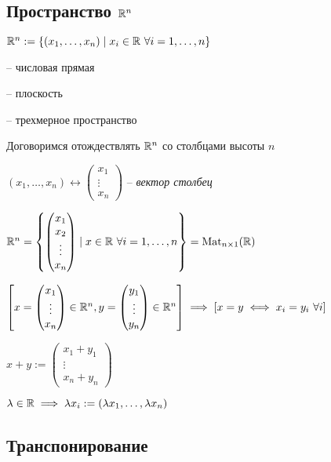 \subsection{Пространство $\mathbb{R}^n$}
$\mathbb{R}^n := \{(x_1, \dots, x_n) \mid x_i \in \mathbb{R} \ \forall i = 1, \dots, n \}$

\begin{description}[nosep]
\item[$\RR^1$] -- числовая прямая
\item[$\RR^2$] -- плоскость
\item[$\RR^3$] -- трехмерное пространство
\end{description}

\bigskip
Договоримся отождествлять \( \mathbb{R}^n \) со столбцами высоты \( n \)

$(x_1, \dots, x_n) \leftrightarrow \begin{pmatrix} x_1 \\ \vdots \\ x_n \end{pmatrix}$ -- \textit{вектор столбец}

$\mathbb{R}^n = \left\{\begin{pmatrix} x_1 \\ x_2 \\ \vdots \\ x_n \end{pmatrix} \mid x \in \mathbb{R} \ \forall i = 1, \dots, n \right\} = \text{Mat}_{n \times 1}(\mathbb{R})$

$\left[ x = \begin{pmatrix}
    x_1 \\ \vdots \\ x_n
\end{pmatrix} \in \mathbb{R}^n, y = \begin{pmatrix}
    y_1 \\ \vdots \\ y_n
\end{pmatrix} \in \mathbb{R}^n \right] \implies 
\left[ x = y \iff x_i = y_i \ \forall i \right]$

\( x + y := \begin{pmatrix}
    x_1 + y_1 \\ \vdots \\ x_n + y_n
\end{pmatrix} \)

$\lambda \in \mathbb{R} \implies \lambda x_i := (\lambda x_1, \dots, \lambda x_n)$


\subsection{Транспонирование}

